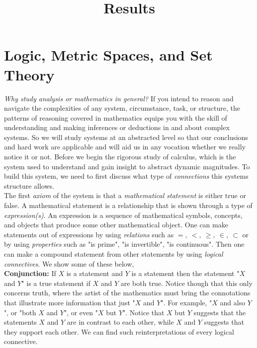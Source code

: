 \documentclass{article}
\title{Results}
\theoremstyle{definition}
\theoremstyle{remark}
\begin{document}
\maketitle

\tableofcontents



\section{Logic, Metric Spaces, and Set Theory}




\indent \textit{Why study analysis or mathematics in general?} If you intend to reason and navigate the complexities of any system, circumstance, task, or structure, the patterns of reasoning covered in mathematics equips you with the skill of understanding and making inferences or deductions in and about complex systems. So we will study systems at an abstracted level so that our conclusions and hard work are applicable and will aid us in any vocation whether we really notice it or not.  
\indent Before we begin the rigorous study of calculus, which is the system used to understand and gain insight to abstract dynamic magnitudes. To build this system, we need to first discuss what type of \textit{connections} this systems structure allows. \\
\indent The first \textit{axiom} of the system is that a \textit{mathematical statement} is either true or false. A mathematical statement is a relationship that is shown through a type of \textit{expression(s)}. An expression is a sequence of mathematical symbols, concepts, and objects that produce some other mathematical object. One can make statements out of expressions by using \textit{relations} such as  \(=, \ <, \ \geq, \ \in, \ \subset \) or by using \textit{properties} such as "is prime", "is invertible", "is continuous". Then one can make a compound statement from other statements by using \textit{logical connectives}. We show some of these below, \\
\textbf{Conjunction:} If \(X\) is a statement and $Y$ is a statement then the statement "$X$ and $Y$" is a true statement if $X$ and $Y$ are both true. Notice though that this only concerns truth, where the artist of the mathematics must bring the connotations that illustrate more information that just "$X$ and $Y$". For example, "$X$ and also $Y$", or "both $X$ and $Y$", or even "$X$ but $Y$". Notice that $X$ but $Y$ suggests that the statements $X$ and $Y$ are in contrast to each other, while $X$ and $Y$ suggests that they support each other. We can find such reinterpretations of every logical connective.\\
\end{document}
